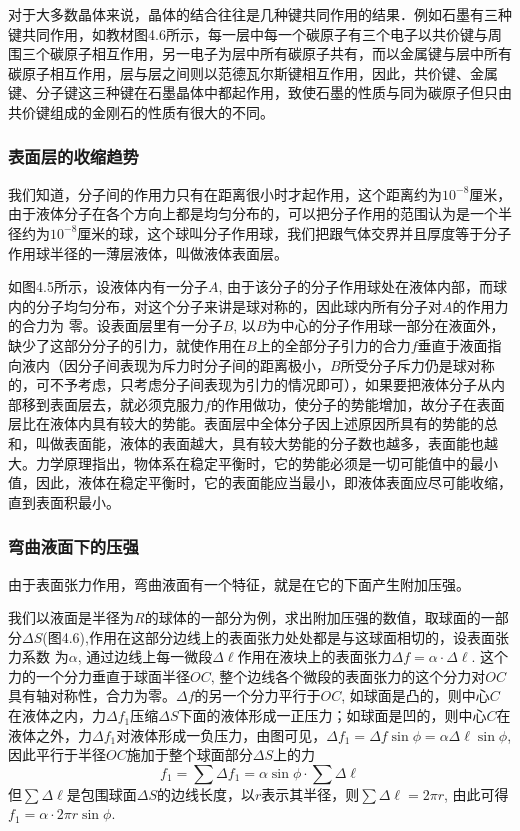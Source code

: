 对于大多数晶体来说，晶体的结合往往是几种键共同作用的结果．例如石墨有三种键共同作用，如教材图4.6所示，每一层中每一个碳原子有三个电子以共价键与周围三个碳原子相互作用，另一电子为层中所有碳原子共有，而以金属键与层中所有碳原子相互作用，层与层之间则以范德瓦尔斯键相互作用，因此，共价键、金属键、分子键这三种键在石墨晶体中都起作用，致使石墨的性质与同为碳原子但只由共价键组成的金刚石的性质有很大的不同。

\subsubsection{表面层的收缩趋势}
我们知道，分子间的作用力只有在距离很小时才起作用，这个距离约为$10^{-8}$厘米，由于液体分子在各个方向上都是均匀分布的，可以把分子作用的范围认为是一个半径约为$10^{-8}$厘米的球，这个球叫分子作用球，我们把跟气体交界并且厚度等于分子作用球半径的一薄层液体，叫做液体表面层。
\begin{figure}[htp]
    \centering
    \caption{}
\end{figure}

如图4.5所示，设液体内有一分子$A$, 由于该分子的分子作用球处在液体内部，而球内的分子均匀分布，对这个分子来讲是球对称的，因此球内所有分子对$A$的作用力的合力为
零。设表面层里有一分子$B$, 以$B$为中心的分子作用球一部分在液面外，缺少了这部分分子的引力，就使作用在$B$上的全部分子引力的合力$f$垂直于液面指向液内（因分子间表现为斥力时分子间的距离极小，$B$所受分子斥力仍是球对称的，可不予考虑，只考虑分子间表现为引力的情况即可），如果要把液体分子从内部移到表面层去，就必须克服力$f$的作用做功，使分子的势能增加，故分子在表面层比在液体内具有较大的势能。表面层中全体分子因上述原因所具有的势能的总和，叫做表面能，液体的表面越大，具有较大势能的分子数也越多，表面能也越大。力学原理指出，物体系在稳定平衡时，它的势能必须是一切可能值中的最小值，因此，液体在稳定平衡时，它的表面能应当最小，即液体表面应尽可能收缩，直到表面积最小。

\subsubsection{弯曲液面下的压强}

由于表面张力作用，弯曲液面有一个特征，就是在它的下面产生附加压强。
\begin{figure}[htp]
    \centering
    \caption{}
\end{figure}

我们以液面是半径为$R$的球体的一部分为例，求出附加压强的数值，取球面的一部分$\Delta S$(图4.6),作用在这部分边线上的表面张力处处都是与这球面相切的，设表面张力系数
为$\alpha$, 通过边线上每一微段$\Delta\ell$作用在液块上的表面张力$\Delta f=\alpha\cdot \Delta\ell$. 这个力的一个分力垂直于球面半径$OC$, 整个边线各个微段的表面张力的这个分力对$OC$具有轴对称性，合力为零。$\Delta f$的另一个分力平行于$OC$, 如球面是凸的，则中心$C$在液体之内，力$\Delta f_1$压缩$\Delta S$下面的液体形成一正压力；如球面是凹的，则中心$C$在液体之外，力$\Delta f_1$对液体形成一负压力，由图可见，$\Delta f_1=\Delta f\sin\phi=\alpha\Delta \ell\sin\phi$, 因此平行于半径$OC$施加于整个球面部分$\Delta S$上的力
\[f_1=\sum \Delta f_1=\alpha\sin\phi\cdot \sum \Delta \ell\]
但$\sum \Delta \ell$是包围球面$\Delta S$的边线长度，以$r$表示其半径，则$\sum \Delta \ell=2\pi r$, 由此可得 $f_1=\alpha\cdot 2\pi r\sin\phi$.

